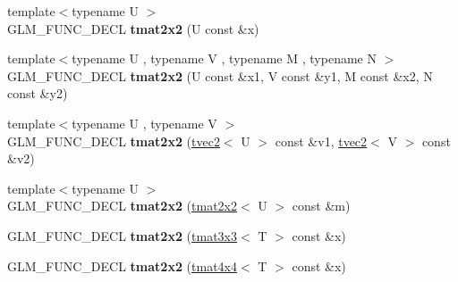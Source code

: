 \begin{DoxyCompactItemize}
\item 
\hypertarget{structglm_1_1detail_1_1tmat2x2_aeb6edeadf2a08e18438d845139c6c0fd}{}{\footnotesize template$<$typename U $>$ }\\G\+L\+M\+\_\+\+F\+U\+N\+C\+\_\+\+D\+E\+C\+L {\bfseries tmat2x2} (U const \&x)\label{structglm_1_1detail_1_1tmat2x2_aeb6edeadf2a08e18438d845139c6c0fd}

\item 
\hypertarget{structglm_1_1detail_1_1tmat2x2_a6d7150d2d56275f0286fe5bdbf57c004}{}{\footnotesize template$<$typename U , typename V , typename M , typename N $>$ }\\G\+L\+M\+\_\+\+F\+U\+N\+C\+\_\+\+D\+E\+C\+L {\bfseries tmat2x2} (U const \&x1, V const \&y1, M const \&x2, N const \&y2)\label{structglm_1_1detail_1_1tmat2x2_a6d7150d2d56275f0286fe5bdbf57c004}

\item 
\hypertarget{structglm_1_1detail_1_1tmat2x2_a050865e2f51e62b964feda65c528dc17}{}{\footnotesize template$<$typename U , typename V $>$ }\\G\+L\+M\+\_\+\+F\+U\+N\+C\+\_\+\+D\+E\+C\+L {\bfseries tmat2x2} (\hyperlink{structglm_1_1detail_1_1tvec2}{tvec2}$<$ U $>$ const \&v1, \hyperlink{structglm_1_1detail_1_1tvec2}{tvec2}$<$ V $>$ const \&v2)\label{structglm_1_1detail_1_1tmat2x2_a050865e2f51e62b964feda65c528dc17}

\item 
\hypertarget{structglm_1_1detail_1_1tmat2x2_a5c569df8414a3a9ce961be72af41369f}{}{\footnotesize template$<$typename U $>$ }\\G\+L\+M\+\_\+\+F\+U\+N\+C\+\_\+\+D\+E\+C\+L {\bfseries tmat2x2} (\hyperlink{structglm_1_1detail_1_1tmat2x2}{tmat2x2}$<$ U $>$ const \&m)\label{structglm_1_1detail_1_1tmat2x2_a5c569df8414a3a9ce961be72af41369f}

\item 
\hypertarget{structglm_1_1detail_1_1tmat2x2_ae1edb9d6f575dae334a56cb4e0bc1d30}{}G\+L\+M\+\_\+\+F\+U\+N\+C\+\_\+\+D\+E\+C\+L {\bfseries tmat2x2} (\hyperlink{structglm_1_1detail_1_1tmat3x3}{tmat3x3}$<$ T $>$ const \&x)\label{structglm_1_1detail_1_1tmat2x2_ae1edb9d6f575dae334a56cb4e0bc1d30}

\item 
\hypertarget{structglm_1_1detail_1_1tmat2x2_a28b0e13e8cb74488c421f5ed8abc22a3}{}G\+L\+M\+\_\+\+F\+U\+N\+C\+\_\+\+D\+E\+C\+L {\bfseries tmat2x2} (\hyperlink{structglm_1_1detail_1_1tmat4x4}{tmat4x4}$<$ T $>$ const \&x)\label{structglm_1_1detail_1_1tmat2x2_a28b0e13e8cb74488c421f5ed8abc22a3}


\end{DoxyCompactItemize}
